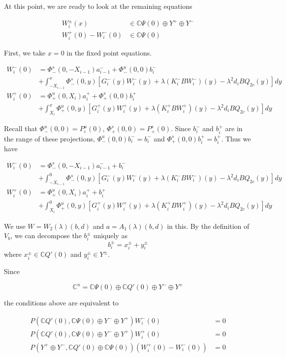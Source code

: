 \documentclass[12pt]{article}
\def\C{{\mathbb C}}
\begin{document}
At this point, we are ready to look at the remaining equations

\begin{align*}
W_i^\pm(x) &\in \C \Psi(0) \oplus Y^+ \oplus Y^- \\
W_i^+(0) - W_i^-(0) &\in \C \Psi(0) 
\end{align*}

First, we take $x = 0$ in the fixed point equations.

\begin{align*}
W_i^-(0) &= \Phi^s_-(0, -X_{i-1})a^-_{i-1} + \Phi^u_-(0, 0)b_i^- \\
&+ \int_{-X_{i-1}}^x \Phi^s_-(0, y)[G_i^-(y) W_i^-(y) + \lambda (K_i^-B W_i^-)(y) - \lambda^2 d_i B Q_{2c}(y) ] dy \\
W_i^+(0) &= \Phi^u_+(0, X_i)a^+_{i} + \Phi^s_+(0, 0)b_i^+ \\
&+ \int_{X_{i}}^x \Phi^u_+(0, y)[G_i^+(y) W_i^+(y) + \lambda (K_i^+ B W_i^+)(y) - \lambda^2 d_i B Q_{2c}(y) ] dy
\end{align*}

Recall that $\Phi^u_-(0, 0) = P^u_i(0)$, $\Phi^s_+(0, 0) = P^s_+(0)$. Since $b_i^-$ and $b_i^+$ are in the range of these projections, $\Phi^u_-(0, 0)b_i^- = b_i^-$ and $\Phi^s_+(0, 0)b_i^+ = b_i^+ $. Thus we have

\begin{align*}
W_i^-(0) &= \Phi^s_-(0, -X_{i-1})a^-_{i-1} + b_i^- \\
&+ \int_{-X_{i-1}}^0 \Phi^s_-(0, y)[G_i^-(y) W_i^-(y) + \lambda (K_i^-B W_i^-)(y) - \lambda^2 d_i B Q_{2c}(y) ] dy \\
W_i^+(0) &= \Phi^u_+(0, X_i)a^+_{i} + b_i^+ \\
&+ \int_{X_{i}}^0 \Phi^u_+(0, y)[G_i^+(y) W_i^+(y) + \lambda (K_i^+ B W_i^+)(y) - \lambda^2 d_i B Q_{2c}(y) ] dy
\end{align*}

We use $W = W_2(\lambda)(b,d)$ and $a = A_1(\lambda)(b,d)$ in this. By the definition of $V_b$, we can decompose the $b_i^\pm$ uniquely as
\[
b_i^\pm = x_i^\pm + y_i^\pm
\]
where $x_i^\pm \in \C Q'(0)$ and $y_i^\pm \in Y^\pm$. 

Since

\[
\C^n = \C\Psi(0) \oplus \C Q'(0) \oplus Y^- \oplus Y^+
\]

the conditions above are equivalent to

\begin{align*}\label{projeq}
P(\C Q'(0), \C\Psi(0) \oplus Y^- \oplus Y^+)W_i^-(0) &= 0 \\
P(\C Q'(0), \C\Psi(0) \oplus Y^- \oplus Y^+)W_i^+(0) &= 0 \\
P(Y^+ \oplus Y^-, \C Q'(0) \oplus \C\Psi(0) )(W_i^+(0) - W_i^-(0)) &= 0 \\
\end{align*}
\end{document}
